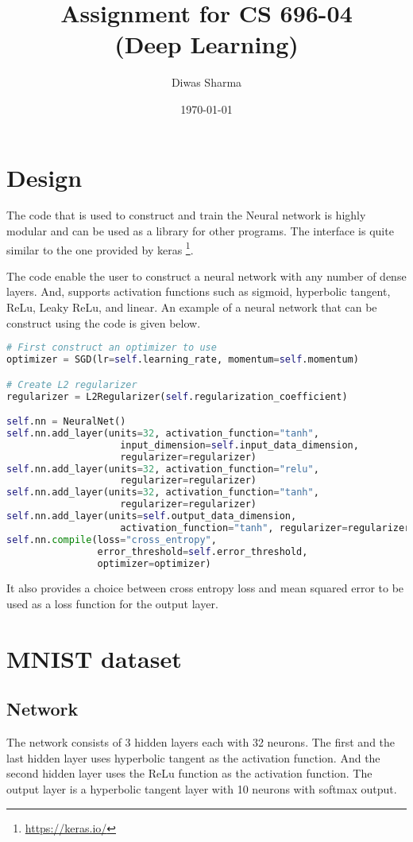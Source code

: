 \documentclass{article}
\title{Assignment for CS 696-04 \\ (Deep Learning)}
\author{Diwas Sharma}
\date{\today}
\begin{document}
\maketitle
\newpage

\section{Design}
The code that is used to construct and train the Neural network is highly modular and
can be used as a library for other programs. The interface is quite similar to the one
provided by keras \footnote{\url{https://keras.io/}}.

The code enable the user to construct a neural network with any number of dense
layers. And, supports activation functions such as sigmoid, hyperbolic tangent,
ReLu, Leaky ReLu, and linear. An example of a neural network that can be construct
using the code is given below.

\begin{lstlisting}[language=python]
# First construct an optimizer to use
optimizer = SGD(lr=self.learning_rate, momentum=self.momentum)

# Create L2 regularizer
regularizer = L2Regularizer(self.regularization_coefficient)

self.nn = NeuralNet()
self.nn.add_layer(units=32, activation_function="tanh",
                    input_dimension=self.input_data_dimension,
                    regularizer=regularizer)
self.nn.add_layer(units=32, activation_function="relu",
                    regularizer=regularizer)
self.nn.add_layer(units=32, activation_function="tanh",
                    regularizer=regularizer)
self.nn.add_layer(units=self.output_data_dimension,
                    activation_function="tanh", regularizer=regularizer)
self.nn.compile(loss="cross_entropy",
                error_threshold=self.error_threshold,
                optimizer=optimizer)
\end{lstlisting}

It also provides a choice between cross entropy loss and mean squared
error to be used as a loss function for the output layer.

\section{MNIST dataset}
\subsection{Network}
The network consists of 3 hidden layers each with 32 neurons.  The first and the last
hidden layer uses hyperbolic tangent as the activation function. And the second
hidden layer uses the ReLu function as the activation function. The output layer
is a hyperbolic tangent layer with 10 neurons with softmax output.
\end{document}
